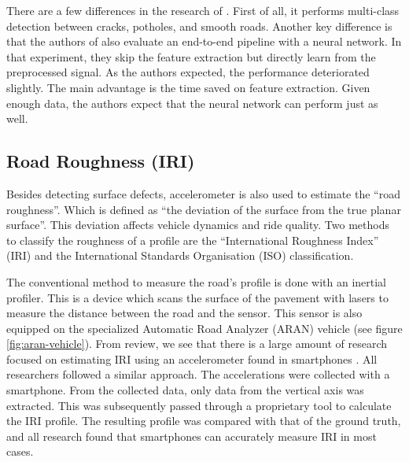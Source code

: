There are a few differences in the research of . First of all, it performs multi-class detection between cracks, potholes, and smooth roads. Another key difference is that the authors of  also evaluate an end-to-end pipeline with a neural network. In that experiment, they skip the feature extraction but directly learn from the preprocessed signal. As the authors expected, the performance deteriorated slightly. The main advantage is the time saved on feature extraction. Given enough data, the authors expect that the neural network can perform just as well.


\subsection{Road Roughness (IRI)}
Besides detecting surface defects, accelerometer is also used to estimate the ``road roughness''. Which is defined as ``the deviation of the surface from the true planar surface''. This deviation affects vehicle dynamics and ride quality. Two methods to classify the roughness of a profile are the ``International Roughness Index'' (IRI) \cite{Sayers1986} and the International Standards Organisation (ISO) \cite{ISO8608} classification. 

The conventional method to measure the road's profile is done with an inertial profiler. This is a device which scans the surface of the pavement with lasers to measure the distance between the road and the sensor. This sensor is also equipped on the specialized Automatic Road Analyzer (ARAN) vehicle (see figure \ref{fig:aran-vehicle}). From review, we see that there is a large amount of research focused on estimating IRI using an accelerometer found in smartphones \cite{Hanson2014,Buttlar2014,Gupta2020,Jeong2020}. All researchers followed a similar approach. The accelerations were collected with a smartphone. From the collected data, only data from the vertical axis was extracted. This was subsequently passed through a proprietary tool to calculate the IRI profile. The resulting profile was compared with that of the ground truth, and all research found that smartphones can accurately measure IRI in most cases.


